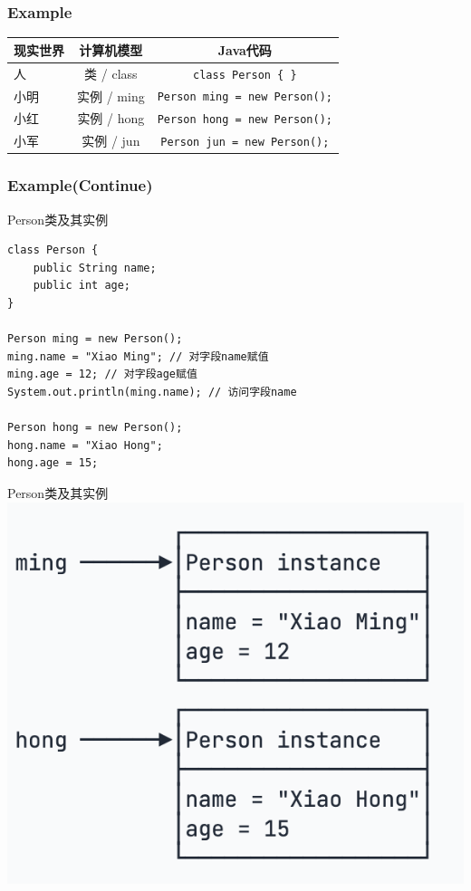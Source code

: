 \documentclass[UTF8, 16pt]{beamer}
\begin{document}
\begin{frame}
    \frametitle{Example}
    \begin{table}
        \centering
        \vspace{-0.5cm}
        \setlength{\tabcolsep}{5mm}
        {
            \begin{tabular}{lcc}
                \toprule %
                \textbf{现实世界} & \textbf{计算机模型} & \textbf{Java代码}                      \\ \midrule
                人             & 类 / class      & \texttt{class Person \{ \}}          \\
                小明            & 实例 / ming      & \texttt{Person ming = new Person();} \\
                小红            & 实例 / hong      & \texttt{Person hong = new Person();} \\
                小军            & 实例 / jun       & \texttt{Person jun = new Person();}  \\ \bottomrule
            \end{tabular}
        }
    \end{table}
\end{frame}

\begin{frame}[fragile]
    \frametitle{Example(Continue)}
    \textcolor{sufered}{Person类及其实例}
    \begin{lstlisting}
class Person {
    public String name;
    public int age;
}

Person ming = new Person();
ming.name = "Xiao Ming"; // 对字段name赋值
ming.age = 12; // 对字段age赋值
System.out.println(ming.name); // 访问字段name

Person hong = new Person();
hong.name = "Xiao Hong";
hong.age = 15;
    \end{lstlisting}
\end{frame}

\begin{frame}
    \centering
    \textcolor{sufered}{Person类及其实例}
    \includegraphics[width=0.8\linewidth]{ch2/person.png}
\end{frame}
\end{document}
